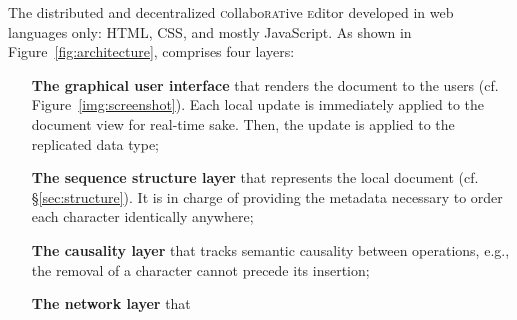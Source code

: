 The distributed and decentralized \textsc{c}ollabo\textsc{rat}ive
\textsc{e}ditor \CRATE developed in web languages only: HTML, CSS, and mostly
JavaScript. As shown in Figure~\ref{fig:architecture}, \CRATE comprises four
layers:
\begin{itemize}
\item [\textbf{The graphical user interface}] that renders the document to the users
  (cf. Figure~\ref{img:screenshot}). Each local update is immediately applied to
  the document view for real-time sake. Then, the update is applied to the
  replicated data type;
\item [\textbf{The sequence structure layer}] that represents the local document
  (cf. §\ref{sec:structure}). It is in charge of providing the metadata
  necessary to order each character identically anywhere;
\item [\textbf{The causality layer}] that tracks semantic causality between operations,
  e.g., the removal of a character cannot precede its insertion;
\item [\textbf{The network layer}] that
\end{itemize}



